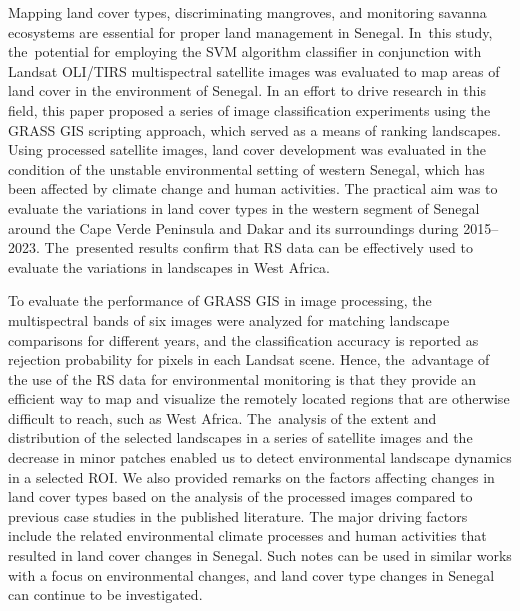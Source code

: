 \documentclass[earth,article,accept,pdftex,moreauthors]{Definitions/mdpi}
\begin{document}
{{Mapping land cover types, discriminating mangroves, and monitoring savanna ecosystems {are} essential for proper land management in Senegal. In~{this} study, the~potential for employing the SVM algorithm classifier in conjunction with Landsat OLI/TIRS multispectral satellite images was evaluated to map areas {of} land cover in the environment of Senegal{.} }In an effort to drive research in this field, this paper proposed a series of  image classification experiments using the GRASS GIS scripting approach, which served as a means of ranking landscapes{. Using processed satellite images, }land cover development {was evaluated} in the condition of the unstable environmental setting of western Senegal{, which has been }affected by climate change {and human activities}. {{The practical} aim was }to evaluate the variations {in} land cover types in the western segment of Senegal around the Cape Verde Peninsula and Dakar and its surroundings{ during} 2015--2023. The~presented results confirm that {RS} data{ }can be effectively used to evaluate the variations in landscapes in West Africa{.} 

{To }evaluate the performance of GRASS GIS{ }in image processing, {the }{multispectral bands of six} images were analyzed for matching{ }landscape comparisons for different years{, }and the classification accuracy is reported as rejection probability for pixels in each Landsat scene. Hence, the~advantage of the use of the {RS} data for environmental monitoring is that they provide an efficient way to map and visualize the remotely located regions that are otherwise difficult to reach, such as{ }West Africa. The~analysis of the extent and distribution of the selected landscapes in a series of satellite images and the decrease in minor patches enabled us to detect  environmental landscape dynamics in a selected {ROI}. We also provided{ }remarks on the {factors affecting changes in} land cover types{ }based on the analysis of the processed images compared to  previous {case }studies {in} the published literature. {The} major driving factors {include the} related environmental climate processes {and human activities} that resulted in land cover changes in Senegal. Such notes can be used in{ }similar works {with a }focus on  environmental changes, and  land cover type changes in Senegal can continue to be investigated{.}

}
\end{document}
